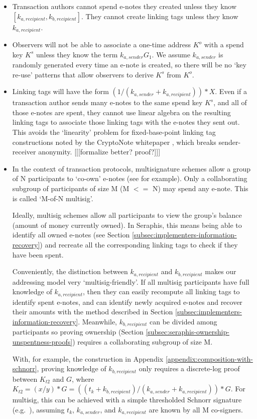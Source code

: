 \begin{itemize}
    \item Transaction authors cannot spend e-notes they created unless they know $[k_{a, recipient}, k_{b, recipient}]$. They cannot create linking tags unless they know $k_{a, recipient}$.

    \item Observers will not be able to associate a one-time address $K^o$ with a spend key $K^s$ unless they know the term $k_{a,sender} G_1$. We assume $k_{a,sender}$ is randomly generated every time an e-note is created, so there will be no `key re-use' patterns that allow observers to derive $K^s$ from $K^o$.

    \item Linking tags will have the form $(1/(k_{a, sender} + k_{a, recipient}))*X$. Even if a transaction author sends many e-notes to the same spend key $K^s$, and all of those e-notes are spent, they cannot use linear algebra on the resulting linking tags to associate those linking tags with the e-notes they sent out. This avoids the `linearity' problem for fixed-base-point linking tag constructions noted by the CryptoNote whitepaper \cite{cryptoNoteWhitePaper}, which breaks sender-receiver anonymity. [[[formalize better? proof?]]]

    \item In the context of transaction protocols, multisignature schemes allow a group of N participants to `co-own' e-notes (see \cite{MRL-0009-multisig} for example). Only a collaborating subgroup of participants of size M (M $<=$ N) may spend any e-note. This is called `M-of-N multisig'.

    Ideally, multisig schemes allow all participants to view the group's balance (amount of money currently owned). In Seraphis, this means being able to identify all owned e-notes (see Section \ref{subsec:implementers-information-recovery}) and recreate all the corresponding linking tags to check if they have been spent.

    Conveniently, the distinction between $k_{a, recipient}$ and $k_{b, recipient}$ makes our addressing model very `multisig-friendly'. If all multisig participants have full knowledge of $k_{a, recipient}$, then they can easily recompute all linking tags to identify spent e-notes, and can identify newly acquired e-notes and recover their amounts with the method described in Section \ref{subsec:implementers-information-recovery}. Meanwhile, $k_{b, recipient}$ can be divided among participants so proving ownership (Section \ref{subsec:seraphis-ownership-unspentness-proofs}) requires a collaborating subgroup of size M.

    With, for example, the construction in Appendix \ref{appendix:composition-with-schnorr}, proving knowledge of $k_{b, recipient}$ only requires a discrete-log proof between $K_{t2}$ and $G$, where $K_{t2} = (x/y)*G = ((t_k + k_{b, recipient})/(k_{a, sender} + k_{a, recipient}))*G$. For multisig, this can be achieved with a simple thresholded Schnorr signature (e.g.\ \cite{...}), assuming $t_k$, $k_{a, sender}$, and $k_{a, recipient}$ are known by all M co-signers.
\end{itemize}



